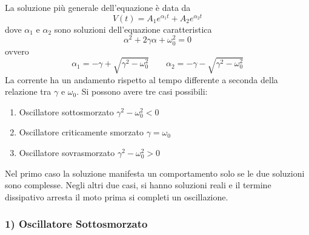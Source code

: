La soluzione pi\`u generale dell'equazione \`e data da 
\begin{equation*}
	V(t) = A_1 e^{ \alpha_1t} + A_2 e^{\alpha_2 t}
\end{equation*}
dove $\alpha _1$ e $\alpha_2$ sono soluzioni dell'equazione caratteristica 
\begin{equation*}
	\alpha^2 + 2 \gamma \alpha + \omega_0^2 = 0
\end{equation*}
ovvero
\begin{equation*}
	\alpha_1 = - \gamma + \sqrt{\gamma^2 - \omega_0^2} \quad \quad \alpha_2 = -\gamma - \sqrt{\gamma^2 - \omega_0^2}
\end{equation*}
La corrente ha un andamento rispetto al tempo differente a seconda della relazione tra $\gamma$ e $\omega_0$. Si possono avere tre casi possibili:
\begin{enumerate}
	\item Oscillatore sottosmorzato $\gamma^2 - \omega_0^2 <0$
	\item Oscillatore criticamente smorzato $\gamma = \omega_0$
	\item Oscillatore sovrasmorzato $\gamma^2 - \omega_0^2 >0$
\end{enumerate}
Nel primo caso la soluzione manifesta un comportamento solo se le due soluzioni sono complesse. Negli altri due casi, si hanno soluzioni reali e il termine dissipativo arresta il moto prima si completi un oscillazione.

\subsubsection{1) Oscillatore Sottosmorzato}

